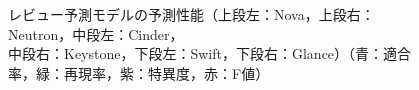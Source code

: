 \documentclass[submit]{ipsj}
\begin{document}
\begin{figure}[t]
\begin{minipage}[b]{0.65\columnwidth}
\end{minipage}
    \caption{レビュー予測モデルの予測性能（上段左：Nova，上段右：Neutron，中段左：Cinder，\\ 中段右：Keystone，下段左：Swift，下段右：Glance）（青：適合率，緑：再現率，紫：特異度，赤：F値）}
    \label{fig:review_base}
\end{figure}








\end{document}
